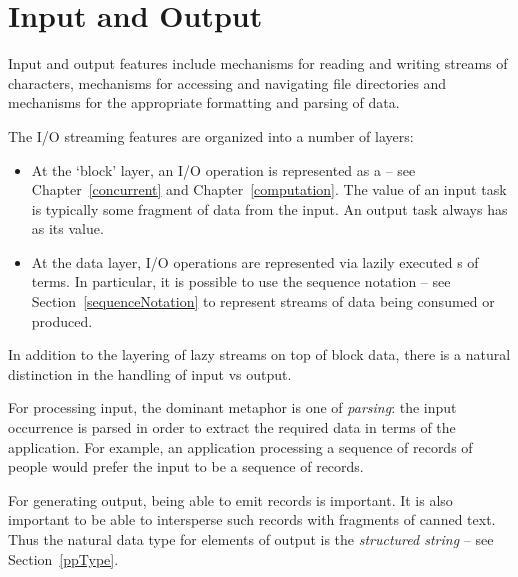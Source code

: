\chapter{Input and Output}
\label{io}

Input and output features include mechanisms for reading and writing streams of characters, mechanisms for accessing and navigating file directories and mechanisms for the appropriate formatting and parsing of data.

The I/O streaming features are organized into a number of layers:
\begin{itemize}
\item At the `block' layer, an I/O operation is represented as a  -- see Chapter~\vref{concurrent} and Chapter~\vref{computation}. The value of an input task is typically some fragment of data from the input. An output task always has \q{()} as its value.
\item At the data layer, I/O operations are represented via lazily executed s of terms. In particular, it is possible to use the sequence notation -- see Section~\vref{sequenceNotation} to represent streams of data being consumed or produced.
\end{itemize}

In addition to the layering of lazy streams on top of block data, there is a natural distinction in the handling of input vs output.

For processing input, the dominant metaphor is one of \emph{parsing}: the input occurrence is parsed in order to extract the required data in terms of the application. For example, an application processing a sequence of records of people would prefer the input to be a sequence of  records. 

For generating output, being able to emit  records is important. It is also important to be able to intersperse such records with fragments of canned text. Thus the natural data type for elements of output is the \emph{structured string} -- see Section~\vref{ppType}. 

